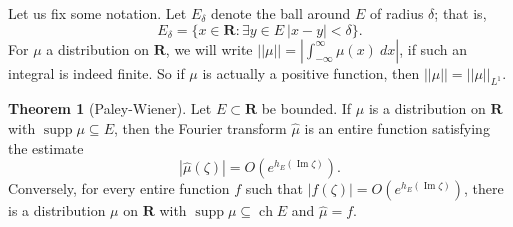 \documentclass[12pt]{report}
\newcommand{\RR}{\mathbf{R}}
\DeclareMathOperator{\ch}{ch}
\DeclareMathOperator{\supp}{supp}
\renewcommand{\Im}{\operatorname{Im}}
\theoremstyle{definition}
\newtheorem{theorem}{Theorem}[chapter]
\begin{document}
    Let us fix some notation. Let $E_\delta$ denote the ball around $E$ of radius $\delta$; that is,
$$E_\delta = \{x \in \RR: \exists y \in E~|x - y| < \delta\}.$$
    For $\mu$ a distribution on $\RR$, we will write $||\mu|| = |\int_{-\infty}^\infty \mu(x) ~dx|$, if such an integral is indeed finite. So if $\mu$ is actually a positive function, then $||\mu|| = ||\mu||_{L^1}$.
\begin{theorem}[Paley-Wiener]
    Let $E \subset \RR$ be bounded. If $\mu$ is a distribution on $\RR$ with $\supp \mu \subseteq E$, then the Fourier transform $\hat \mu$ is an entire function satisfying the estimate
$$|\hat \mu(\zeta)| = O(e^{h_E(\Im \zeta)}).$$
    Conversely, for every entire function $f$ such that $|f(\zeta)| = O(e^{h_E(\Im \zeta)})$, there is a distribution $\mu$ on $\RR$ with $\supp \mu \subseteq \ch E$ and $\hat \mu = f$.
\end{theorem}
\end{document}
